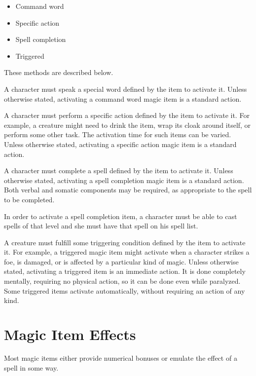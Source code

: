         \begin{itemize}
            \item Command word
            \item Specific action
            \item Spell completion
            \item Triggered
        \end{itemize}

        These methods are described below.

         A character must speak a special word defined by the item to activate it.
        Unless otherwise stated, activating a command word magic item is a standard action.

         A character must perform a specific action defined by the item to activate it.
        For example, a creature might need to drink the item, wrap its cloak around itself, or perform some other task.
        The activation time for such items can be varied.
        Unless otherwise stated, activating a specific action magic item is a standard action.

         A character must complete a spell defined by the item to activate it.
        Unless otherwise stated, activating a spell completion magic item is a standard action.
        Both verbal and somatic components may be required, as appropriate to the spell to be completed.

        In order to activate a spell completion item, a character must be able to cast spells of that level and she must have that spell on his spell list.

         A creature must fulfill some triggering condition defined by the item to activate it.
        For example, a triggered magic item might activate when a character strikes a foe, is damaged, or is affected by a particular kind of magic.
        Unless otherwise stated, activating a triggered item is an immediate action.
        It is done completely mentally, requiring no physical action, so it can be done even while paralyzed.
        Some triggered items activate automatically, without requiring an action of any kind.

\section{Magic Item Effects}
    Most magic items either provide numerical bonuses or emulate the effect of a spell in some way.

